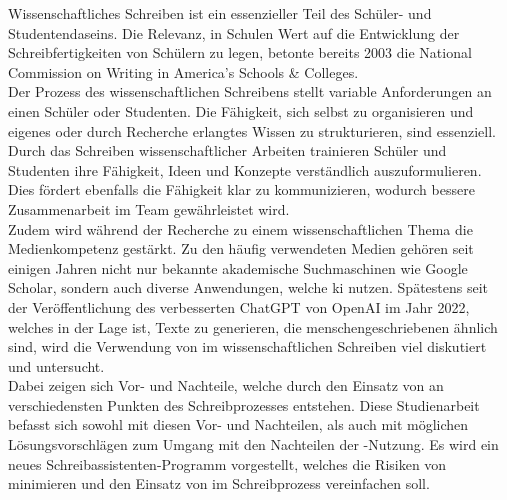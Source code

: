 \documentclass[../main.tex]{subfiles}
\begin{document}
Wissenschaftliches Schreiben ist ein essenzieller Teil des Schüler- und Studentendaseins. 
Die Relevanz, in Schulen Wert auf die Entwicklung der Schreibfertigkeiten von Schülern zu legen, betonte bereits 2003 
die National Commission on Writing in America’s Schools \& Colleges\cite{nationalcommissionwriting}.  \\ Der Prozess des 
wissenschaftlichen Schreibens stellt variable Anforderungen an einen Schüler oder Studenten. Die Fähigkeit, sich selbst zu organisieren und 
eigenes oder durch Recherche erlangtes Wissen zu strukturieren, sind essenziell. Durch das Schreiben 
wissenschaftlicher Arbeiten trainieren Schüler und Studenten ihre Fähigkeit, Ideen und Konzepte verständlich 
auszuformulieren. Dies fördert ebenfalls die Fähigkeit klar zu kommunizieren, wodurch bessere Zusammenarbeit 
im Team gewährleistet wird.\cite{nationalcommissionwriting,teachers,humanWritingToAi} \\ 
Zudem wird während der Recherche zu einem wissenschaftlichen Thema die Medienkompetenz gestärkt. Zu den häufig 
verwendeten Medien gehören seit einigen Jahren nicht nur bekannte akademische Suchmaschinen wie Google Scholar, sondern auch 
diverse Anwendungen, welche \gls{ki} nutzen. Spätestens seit der Veröffentlichung des verbesserten ChatGPT von OpenAI im Jahr 2022, welches in der 
Lage ist, Texte zu generieren, die menschengeschriebenen ähnlich sind, wird die Verwendung von  
im wissenschaftlichen Schreiben viel diskutiert und untersucht.\cite{humanWritingToAi,ZukunftWissenschaftlichesPublizieren}\\
Dabei zeigen sich Vor- und Nachteile, welche durch den Einsatz von  an verschiedensten Punkten des Schreibprozesses entstehen. 
Diese Studienarbeit befasst sich sowohl mit diesen Vor- und Nachteilen, als auch mit möglichen
Lösungsvorschlägen zum Umgang mit den Nachteilen der -Nutzung. Es wird ein neues Schreibassistenten-Programm vorgestellt, welches die Risiken 
von  minimieren und den Einsatz von  im Schreibprozess vereinfachen soll.
\end{document}
